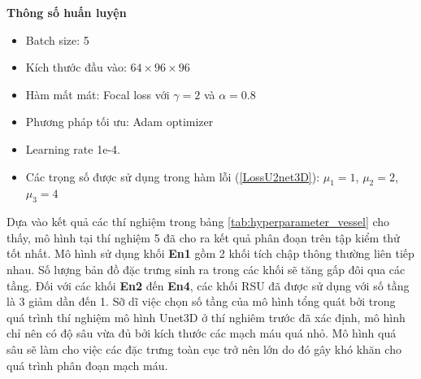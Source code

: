 \noindent \textbf{Thông số huấn luyện}
\begin{itemize}[itemsep=0pt, topsep=0pt]
    \item Batch size: 5
    \item Kích thước đầu vào: $64\times96\times96$
    \item Hàm mất mát: Focal loss với $\gamma=2$ và $\alpha=0.8$
    \item Phương pháp tối ưu: Adam optimizer
    \item Learning rate 1e-4.
    \item Các trọng số được sử dụng trong hàm lỗi (\ref{LossU2net3D}): $\mu_{1} = 1$,  $\mu_{2} = 2$,  $\mu_{3} = 4$
\end{itemize}

Dựa vào kết quả các thí nghiệm trong bảng \ref{tab:hyperparameter_vessel} cho thấy, mô hình tại thí nghiệm 5 đã cho ra kết quả phân đoạn trên tập kiểm thử tốt nhất. Mô hình sử dụng khối \textbf{En1} gồm 2 khối tích chập thông thường liên tiếp nhau. Số lượng bản đồ đặc trưng sinh ra trong các khối sẽ tăng gấp đôi qua các tầng. Đối với các khối \textbf{En2} đến \textbf{En4}, các khối RSU đã được sử dụng với số tầng là 3 giảm dần đến 1. Sỡ dĩ việc chọn số tầng của mô hình tổng quát bởi trong quá trình thí nghiệm mô hình Unet3D ở thí nghiêm trước đã xác định, mô hình chỉ nên có độ sâu vừa đủ bởi kích thước các mạch máu quá nhỏ. Mô hình quá sâu sẽ làm cho việc các đặc trưng toàn cục trở nên lớn do đó gây khó khăn cho quá trình phân đoạn mạch máu.

